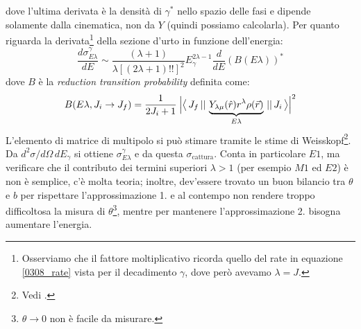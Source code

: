 dove l'ultima derivata è la densità di $\gamma^*$ nello spazio delle fasi e dipende solamente dalla cinematica, non da $Y$ (quindi possiamo calcolarla). Per quanto riguarda la derivata\footnote{Osserviamo che il fattore moltiplicativo ricorda quello del rate in equazione \eqref{0308_rate} vista per il decadimento $\gamma$, dove però avevamo $\lambda = J$.} della sezione d'urto in funzione dell'energia:
$$\frac{d\sigma_{E\lambda}^\gamma}{dE} \sim \frac{(\lambda +1)}{\lambda[(2\lambda + 1)!!]^2} E_\gamma^{2\lambda -1} \frac{d}{dE}(B(E\lambda))^*$$
dove $B$ è la \textit{reduction transition probability} definita come:
$$B(E\lambda, J_i \to J_f) = \frac{1}{2J_i +1 } \: \Bigl | \bigl\langle\, J_f\, ||\,\underbrace{Y_{\lambda \mu}(\hat{r}) r^\lambda \rho(\vec{r})}_{E\lambda}\, ||\,J_i\, \bigr\rangle \Bigr |^2$$
L'elemento di matrice di multipolo si può stimare tramite le stime di Weisskopf\footnote{Vedi .}.\\
Da $d^2\sigma/d\Omega\,dE_\gamma$ si ottiene $\sigma_{E\lambda}^\gamma$ e da questa $\sigma_\text{cattura}$. Conta in particolare $E1$, ma verificare che il contributo dei termini superiori $\lambda >1$ (per esempio $M1$ ed $E2$) è  non è semplice, c'è molta teoria; inoltre, dev'essere trovato un buon bilancio tra $\theta$ e $b$ per rispettare l'approssimazione 1. e al contempo non rendere troppo difficoltosa la misura di $\theta$\footnote{$\theta\to 0$ non è facile da misurare.}, mentre per mantenere l'approssimazione 2. bisogna aumentare l'energia.

